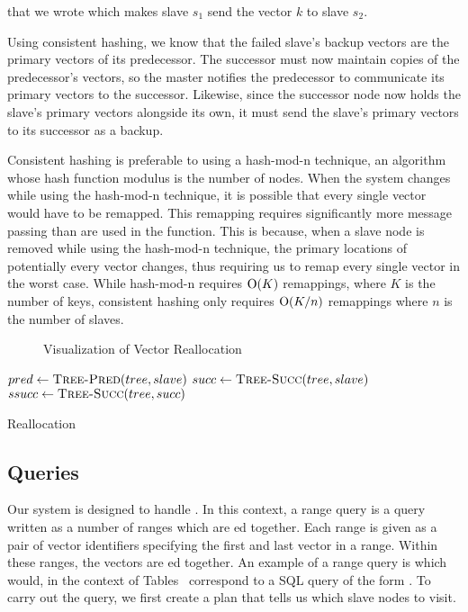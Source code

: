 that we wrote which makes slave \(s_1\) send the vector \(k\) to slave \(s_2\).
\par
Using consistent hashing, we know that the failed slave's backup vectors are
the primary vectors of its predecessor. The successor must now maintain copies
of the predecessor's vectors, so the master notifies the predecessor to
communicate its primary vectors to the successor. Likewise, since the successor
node now holds the slave's primary vectors alongside its own, it must send the
slave's primary vectors to its successor as a backup.
\par
Consistent hashing is preferable to using a hash-mod-n technique, an algorithm
whose hash function modulus is the number of nodes. When the system changes
while using the hash-mod-n technique, it is possible that every single vector
would have to be remapped. This remapping requires significantly more message
passing than are used in the  function. This is because,
when a slave node is removed while using the hash-mod-n technique, the primary
locations of potentially every vector changes, thus requiring us to remap every
single vector in the worst case. \cite{kleppman2017} While hash-mod-n requires
\(\mathrm{O}(K)\) remappings, where \(K\) is the number of keys, consistent
hashing only requires \(\mathrm{O}(K/n)\) remappings where \(n\) is the number of
slaves. \cite{karger1997}
%
\begin{figure}
    \centering
    
    \caption{Visualization of Vector Reallocation}
    \label{fig:vector-reallocation}
\end{figure}
%
\begin{algorithm}
    \begin{algorithmic}
            \State $pred \gets \Call{Tree-Pred}{tree, slave}$
            \State $succ \gets \Call{Tree-Succ}{tree, slave}$
            \State $ssucc \gets \Call{Tree-Succ}{tree, succ}$
                \State {}
            \EndFor
                \State {}
            \EndFor
            \State {}
        \EndProcedure
    \end{algorithmic}
    \caption{Reallocation}
    \label{alg:reallocate}
\end{algorithm}
%
\subsection{Queries}
Our system is designed to handle . In this context, a range
query is a query written as a number of ranges which are ed together.
Each range is given as a pair of vector identifiers specifying the first and
last vector in a range. Within these ranges, the vectors are ed
together. An example of a range query is  which would,
in the context of Tables~
correspond to a SQL query of the form
.
To carry out the query, we first create a plan that tells us which slave nodes
to visit.
%

